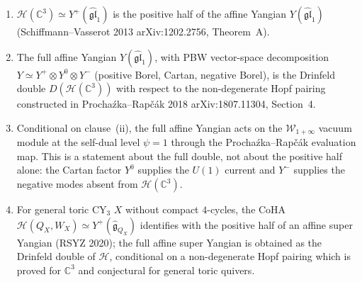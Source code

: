 \begin{corollary}
\label{cor:y-plus-vs-full-Y}
\begin{enumerate}[label=\textup{(\roman*)}]
 \item $\mathcal{H}(\mathbb{C}^3) \simeq Y^+(\widehat{\mathfrak{gl}}_1)$
 is the positive half of the affine Yangian
 $Y(\widehat{\mathfrak{gl}}_1)$
 (Schiffmann--Vasserot 2013 \textup{arXiv:1202.2756}, Theorem~A).
 \item The full affine Yangian
 $Y(\widehat{\mathfrak{gl}}_1)$, with PBW vector-space decomposition
 $Y \simeq Y^+ \otimes Y^0 \otimes Y^-$
 (positive Borel, Cartan, negative Borel), is the Drinfeld double
 $D(\mathcal{H}(\mathbb{C}^3))$ with respect to the non-degenerate
 Hopf pairing constructed in Procha\'zka--Rap\v{c}\'ak 2018
 \textup{arXiv:1807.11304}, Section~4.
 \item Conditional on clause~(ii), the full affine Yangian acts on the
 $\mathcal{W}_{1+\infty}$ vacuum module at the self-dual level
 $\psi=1$ through the Procha\'zka--Rap\v{c}\'ak evaluation map. This is
 a statement about the full double, not about the positive half alone:
 the Cartan factor $Y^0$ supplies the $U(1)$ current and $Y^-$ supplies
 the negative modes absent from $\mathcal{H}(\mathbb{C}^3)$.
 \item For general toric CY$_3$ $X$ without compact $4$-cycles, the
 CoHA $\mathcal{H}(Q_X, W_X) \simeq Y^+(\widehat{\mathfrak{g}}_{Q_X})$
 identifies with the positive half of an affine super Yangian (RSYZ
 2020); the full affine super Yangian is obtained as the Drinfeld
 double of $\mathcal{H}$, conditional on a non-degenerate Hopf pairing
 which is proved for $\mathbb{C}^3$ and conjectural for general toric
 quivers.
\end{enumerate}
\end{corollary}

